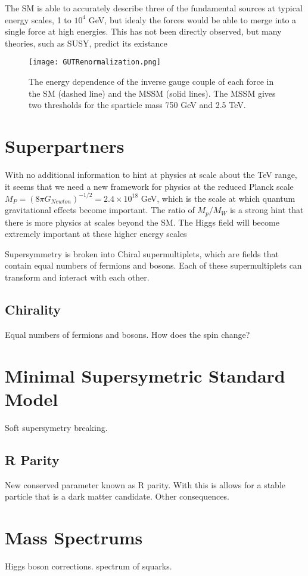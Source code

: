 The SM is able to accurately describe three of the fundamental sources at typical energy scales, 1 to $10^{4}$ GeV, but idealy the forces would be able to merge into a single force at high energies. This has not been directly observed, but many theories, such as SUSY, predict its existance %

\begin{figure}
 	\centering
	\texttt{[image: GUTRenormalization.png]}
 	\caption{The energy dependence of the inverse gauge couple of each force in the SM (dashed line) and the MSSM (solid lines). The MSSM gives two thresholds for the sparticle mass 750 GeV and 2.5 TeV.}
 	\label{GUT} 
\end{figure}


\section{Superpartners}
\label{sec:superpartners}

With no additional information to hint at physics at scale about the TeV range, it seems that we need a new framework for physics at the reduced Planck scale $M_{P}=(8\pi G_{Newton})^{-1/2}=2.4\times10^{18}$ GeV, which is the scale at which quantum gravitational effects become important. The ratio of $M_p/M_W$ is a strong hint that there is more physics at scales beyond the SM. The Higgs field will become extremely important at these higher energy scales

Supersymmetry is broken into Chiral supermultiplets, which are fields that contain equal numbers of fermions and bosons. Each of these supermultiplets can transform and interact with each other. 

\subsection{Chirality}
\label{subsec:chiral}

Equal numbers of fermions and bosons. How does the spin change? 

\section{Minimal Supersymetric Standard Model}
\label{sec:MSSM}

Soft supersymetry breaking. 

\subsection{R Parity}
\label{subsec:rparity}

New conserved parameter known as R parity. With this is allows for a stable particle that is a dark matter candidate. Other consequences.

\section{Mass Spectrums}

Higgs boson corrections. spectrum of squarks. 






